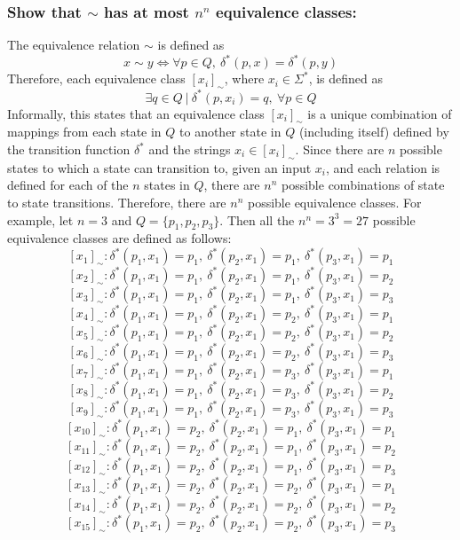 \documentclass[12pt]{article}
\begin{document}
\subsubsection*{Show that $\sim$ has at most $n^n$ equivalence classes:}
The equivalence relation $\sim$ is defined as
$$x \sim y \iff \forall p \in Q,\ \delta^*(p,x) = \delta^*(p,y)$$
Therefore, each equivalence class $[x_i]_{\sim}$, where $x_i \in \Sigma^*$,
is defined as
$$\exists q \in Q\ |\ \delta^*(p,x_i) = q,\ \forall p \in Q$$
Informally, this states that an equivalence class $[x_i]_{\sim}$ is a
unique combination of mappings from each state in $Q$ to another state in $Q$
(including itself) defined by the transition function $\delta^*$
and the strings $x_i \in [x_i]_{\sim}$. Since there are $n$ possible states to
which a state can transition to, given an input $x_i$, and each relation is
defined for each of the $n$ states in $Q$, there are $n^n$ possible
combinations of state to state transitions. Therefore, there are $n^n$ possible
equivalence classes.
\newpage
\noindent For example, let $n = 3$ and $Q = \{p_1, p_2, p_3\}.$ Then all the
$n^n = 3^3 = 27$ possible equivalence classes are defined as follows:
$$[x_1]_{\sim} : \delta^*(p_1, x_1) = p_1,\ \delta^*(p_2, x_1) = p_1,\ \delta^*(p_3, x_1) = p_1$$
$$[x_2]_{\sim} : \delta^*(p_1, x_1) = p_1,\ \delta^*(p_2, x_1) = p_1,\ \delta^*(p_3, x_1) = p_2$$
$$[x_3]_{\sim} : \delta^*(p_1, x_1) = p_1,\ \delta^*(p_2, x_1) = p_1,\ \delta^*(p_3, x_1) = p_3$$
$$[x_4]_{\sim} : \delta^*(p_1, x_1) = p_1,\ \delta^*(p_2, x_1) = p_2,\ \delta^*(p_3, x_1) = p_1$$
$$[x_5]_{\sim} : \delta^*(p_1, x_1) = p_1,\ \delta^*(p_2, x_1) = p_2,\ \delta^*(p_3, x_1) = p_2$$
$$[x_6]_{\sim} : \delta^*(p_1, x_1) = p_1,\ \delta^*(p_2, x_1) = p_2,\ \delta^*(p_3, x_1) = p_3$$
$$[x_7]_{\sim} : \delta^*(p_1, x_1) = p_1,\ \delta^*(p_2, x_1) = p_3,\ \delta^*(p_3, x_1) = p_1$$
$$[x_8]_{\sim} : \delta^*(p_1, x_1) = p_1,\ \delta^*(p_2, x_1) = p_3,\ \delta^*(p_3, x_1) = p_2$$
$$[x_9]_{\sim} : \delta^*(p_1, x_1) = p_1,\ \delta^*(p_2, x_1) = p_3,\ \delta^*(p_3, x_1) = p_3$$
$$[x_{10}]_{\sim} : \delta^*(p_1, x_1) = p_2,\ \delta^*(p_2, x_1) = p_1,\ \delta^*(p_3, x_1) = p_1$$
$$[x_{11}]_{\sim} : \delta^*(p_1, x_1) = p_2,\ \delta^*(p_2, x_1) = p_1,\ \delta^*(p_3, x_1) = p_2$$
$$[x_{12}]_{\sim} : \delta^*(p_1, x_1) = p_2,\ \delta^*(p_2, x_1) = p_1,\ \delta^*(p_3, x_1) = p_3$$
$$[x_{13}]_{\sim} : \delta^*(p_1, x_1) = p_2,\ \delta^*(p_2, x_1) = p_2,\ \delta^*(p_3, x_1) = p_1$$
$$[x_{14}]_{\sim} : \delta^*(p_1, x_1) = p_2,\ \delta^*(p_2, x_1) = p_2,\ \delta^*(p_3, x_1) = p_2$$
$$[x_{15}]_{\sim} : \delta^*(p_1, x_1) = p_2,\ \delta^*(p_2, x_1) = p_2,\ \delta^*(p_3, x_1) = p_3$$
\end{document}
